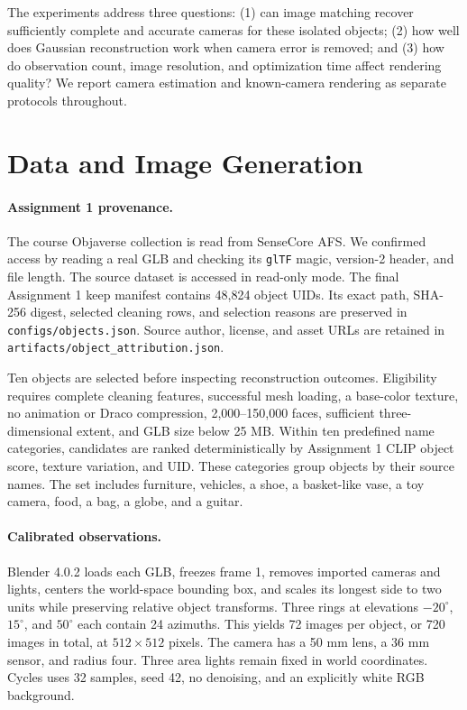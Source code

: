 \documentclass{article}
\begin{document}
The experiments address three questions: (1) can image matching recover sufficiently complete and accurate cameras for these isolated objects; (2) how well does Gaussian reconstruction work when camera error is removed; and (3) how do observation count, image resolution, and optimization time affect rendering quality? We report camera estimation and known-camera rendering as separate protocols throughout.

\section{Data and Image Generation}
\paragraph{Assignment 1 provenance.}
The course Objaverse collection is read from SenseCore AFS. We confirmed access by reading a real GLB and checking its \texttt{glTF} magic, version-2 header, and file length. The source dataset is accessed in read-only mode. The final Assignment 1 keep manifest contains 48,824 object UIDs. Its exact path, SHA-256 digest, selected cleaning rows, and selection reasons are preserved in \texttt{configs/objects.json}. Source author, license, and asset URLs are retained in \texttt{artifacts/object\_attribution.json}.

Ten objects are selected before inspecting reconstruction outcomes. Eligibility requires complete cleaning features, successful mesh loading, a base-color texture, no animation or Draco compression, 2,000--150,000 faces, sufficient three-dimensional extent, and GLB size below 25 MB. Within ten predefined name categories, candidates are ranked deterministically by Assignment 1 CLIP object score, texture variation, and UID. These categories group objects by their source names. The set includes furniture, vehicles, a shoe, a basket-like vase, a toy camera, food, a bag, a globe, and a guitar.

\paragraph{Calibrated observations.}
Blender 4.0.2 loads each GLB, freezes frame 1, removes imported cameras and lights, centers the world-space bounding box, and scales its longest side to two units while preserving relative object transforms. Three rings at elevations $-20^\circ$, $15^\circ$, and $50^\circ$ each contain 24 azimuths. This yields 72 images per object, or 720 images in total, at $512\times512$ pixels. The camera has a 50 mm lens, a 36 mm sensor, and radius four. Three area lights remain fixed in world coordinates. Cycles uses 32 samples, seed 42, no denoising, and an explicitly white RGB background.
\end{document}
